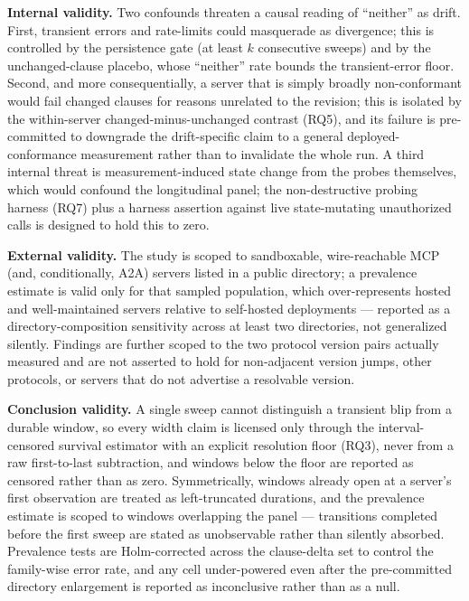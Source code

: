 \documentclass[11pt]{article}
\begin{document}
\textbf{Internal validity.} Two confounds threaten a causal reading of ``neither'' as drift. First, transient errors and rate-limits could masquerade as divergence; this is controlled by the persistence gate (at least $k$ consecutive sweeps) and by the unchanged-clause placebo, whose ``neither'' rate bounds the transient-error floor. Second, and more consequentially, a server that is simply broadly non-conformant would fail changed clauses for reasons unrelated to the revision; this is isolated by the within-server changed-minus-unchanged contrast (RQ5), and its failure is pre-committed to downgrade the drift-specific claim to a general deployed-conformance measurement rather than to invalidate the whole run. A third internal threat is measurement-induced state change from the probes themselves, which would confound the longitudinal panel; the non-destructive probing harness (RQ7) plus a harness assertion against live state-mutating unauthorized calls is designed to hold this to zero.

\textbf{External validity.} The study is scoped to sandboxable, wire-reachable MCP (and, conditionally, A2A) servers listed in a public directory; a prevalence estimate is valid only for that sampled population, which over-represents hosted and well-maintained servers relative to self-hosted deployments --- reported as a directory-composition sensitivity across at least two directories, not generalized silently. Findings are further scoped to the two protocol version pairs actually measured and are not asserted to hold for non-adjacent version jumps, other protocols, or servers that do not advertise a resolvable version.

\textbf{Conclusion validity.} A single sweep cannot distinguish a transient blip from a durable window, so every width claim is licensed only through the interval-censored survival estimator with an explicit resolution floor (RQ3), never from a raw first-to-last subtraction, and windows below the floor are reported as censored rather than as zero. Symmetrically, windows already open at a server's first observation are treated as left-truncated durations, and the prevalence estimate is scoped to windows overlapping the panel --- transitions completed before the first sweep are stated as unobservable rather than silently absorbed. Prevalence tests are Holm-corrected across the clause-delta set to control the family-wise error rate, and any cell under-powered even after the pre-committed directory enlargement is reported as inconclusive rather than as a null.
\end{document}
